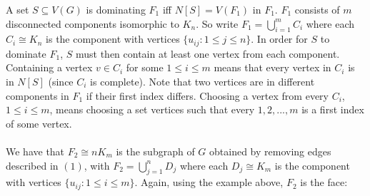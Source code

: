 \documentclass[letterpaper, 11pt]{article}
\newcommand{\1}{\mathds{1}}	%
\theoremstyle{definition}
\begin{document}
\begin{center}


\end{center}
A set $S \subseteq V(G)$ is dominating $F_1$ iff $N[S] = V(F_1)$ in $F_1$. $F_1$ consists of $m$ disconnected components isomorphic to $K_n$.  So write $F_1 = \bigcup \limits _{i=1}^m C_i$ where each $C_i \cong K_n$ is the component with vertices $\{u_{ij}: 1\le j \le n\}$. In order for $S$ to dominate $F_1$, $S$ must then contain at least one vertex from each component.  Containing a vertex $v \in C_i$ for some $1 \le i \le m$ means that every vertex in $C_i$ is in $N[S]$ (since $C_i$ is complete). Note that two vertices are in different components in $F_1$ if their first index differs. Choosing a vertex from every $C_i$, $1 \le i \le m$, means choosing a set vertices such that every $1,2,...,m$ is a first index of some vertex.\\ ~\\ We have that $F_2 \cong nK_m$ is the subgraph of $G$ obtained by removing edges described in $(1)$, with $F_2 = \bigcup \limits _{j=1}^nD_j$ where each $D_j \cong K_m$ is the component with vertices $\{u_{ij}: 1 \le i \le m\}$. Again, using the example above, $F_2$ is the face:
\end{document}

